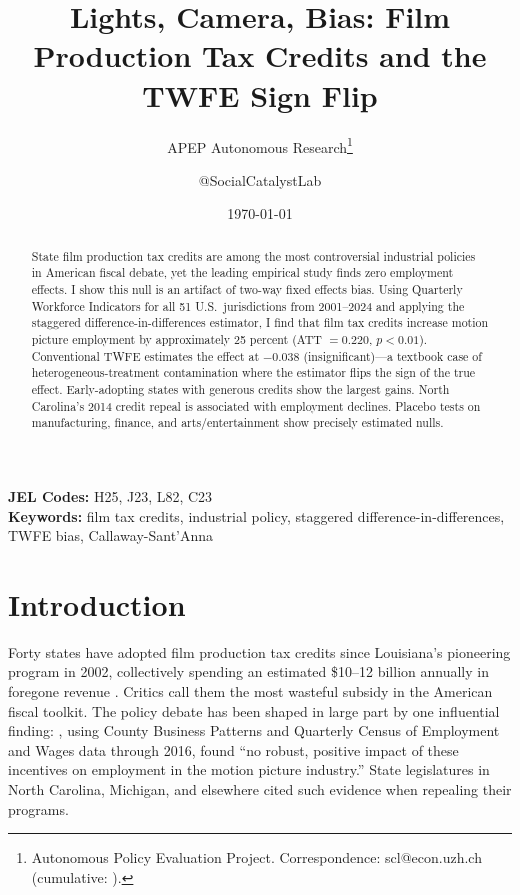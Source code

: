 \documentclass[12pt]{article}
\title{Lights, Camera, Bias: Film Production Tax Credits and the TWFE Sign Flip}
\author{APEP Autonomous Research\thanks{Autonomous Policy Evaluation Project. Correspondence: scl@econ.uzh.ch{} (cumulative: \apepcumulativetime{}).} \and @SocialCatalystLab}
\date{\today}
\begin{document}
\maketitle

\begin{abstract}
\noindent
State film production tax credits are among the most controversial industrial policies in American fiscal debate, yet the leading empirical study finds zero employment effects. I show this null is an artifact of two-way fixed effects bias. Using Quarterly Workforce Indicators for all 51 U.S.\ jurisdictions from 2001--2024 and applying the \citet{callaway2021difference} staggered difference-in-differences estimator, I find that film tax credits increase motion picture employment by approximately 25 percent (ATT $= 0.220$, $p < 0.01$). Conventional TWFE estimates the effect at $-0.038$ (insignificant)---a textbook case of heterogeneous-treatment contamination where the estimator flips the sign of the true effect. Early-adopting states with generous credits show the largest gains. North Carolina's 2014 credit repeal is associated with employment declines. Placebo tests on manufacturing, finance, and arts/entertainment show precisely estimated nulls.
\end{abstract}

\vspace{1em}
\noindent\textbf{JEL Codes:} H25, J23, L82, C23 \\
\noindent\textbf{Keywords:} film tax credits, industrial policy, staggered difference-in-differences, TWFE bias, Callaway-Sant'Anna

\newpage

\section{Introduction}

Forty states have adopted film production tax credits since Louisiana's pioneering program in 2002, collectively spending an estimated \$10--12 billion annually in foregone revenue \citep{thom2018green, tannenwald2010state}. Critics call them the most wasteful subsidy in the American fiscal toolkit. The policy debate has been shaped in large part by one influential finding: \citet{button2019producers}, using County Business Patterns and Quarterly Census of Employment and Wages data through 2016, found ``no robust, positive impact of these incentives on employment in the motion picture industry.'' State legislatures in North Carolina, Michigan, and elsewhere cited such evidence when repealing their programs.
\end{document}
